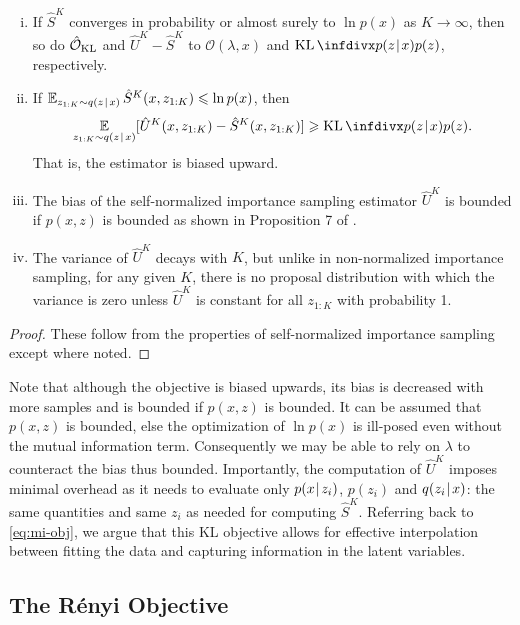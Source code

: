 \begin{proposition}
\label{prop:properties of the KL objective} \mbox{}
\begin{enumerate}[(i)]
\item If $\hat{S}^K$ converges in probability or almost surely to $\ln p(x)$ as $K \to \infty$, then so do $\mathcal{\hat{O}}_{\operatorname{KL}}$ and $\hat{U}^K - \hat{S}^K$ to
$\mathcal{O}(\lambda, x)$ and $\KL\Div{p(z\tmid x)}{p(z)}$, respectively.
\item If $\mathop{{}\mathbb{E}}_{z_{1:K} \sim q(z\hspace{0.08em}|\hspace{0.11em} x)}\hat{S}^K(x,z_{1:K}) \leqslant \ln p(x)$, then
\begin{equation*}
\E_{z_{1:K} \sim q(z\tmid x)}[\hat{U}^K(x,z_{1:K}) - \hat{S}^K(x,z_{1:K})] \geqslant \KL\Div{p(z\tmid x)}{p(z)}.
\end{equation*}
That is, the estimator is biased upward.
\item The bias of the self-normalized importance sampling estimator $\hat{U}^K$ is bounded if $p(x,z)$ is bounded as shown in Proposition 7 of \citet{metelli2020importance}.
\item The variance of $\hat{U}^K$ decays with $K$, but unlike in non-normalized importance sampling, for any given $K$, there is no proposal distribution with which the variance is zero unless $\hat{U}^K$ is constant for all $z_{1:K}$ with probability 1.
\end{enumerate}
\end{proposition}
\begin{proof}
These follow from  the properties of self-normalized importance sampling \citep{art2013mcbook} except where noted.
\end{proof}

Note that although the objective is biased upwards, its bias is decreased with more samples and is bounded if $p(x,z)$ is bounded.
It can be assumed that $p(x,z)$ is bounded, else the optimization of $\ln p(x)$ is ill-posed even without the mutual information term.
Consequently we may be able to rely on $\lambda$ to counteract the bias thus bounded.
Importantly, the computation of $\hat{U}^K$ imposes minimal overhead as it needs to evaluate only $p(x\hspace{0.08em}|\hspace{0.11em} z_i)$, $p(z_i)$ and $q(z_i\hspace{0.08em}|\hspace{0.11em} x)$: the same quantities and same $z_i$ as needed for computing $\hat{S}^K$.
Referring back to \eqref{eq:mi-obj}, we argue that this KL objective allows for effective interpolation between fitting the data and capturing information in the latent variables.

\subsection{The Rényi Objective}
\label{sec:renyi-objective}

